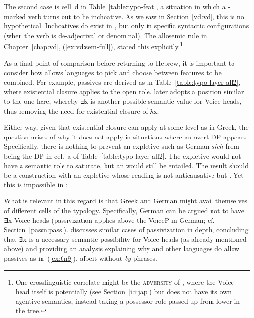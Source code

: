 \begin{exe}
\begin{xlist}
\begin{exe}
\begin{exe}
\begin{xlist}
\begin{exe}
\begin{exe}
\begin{exe}
\begin{exe}
\begin{exe}
\begin{xlist}
The second case is cell~d in Table~\ref{table:typo-feat}, a situation in which a -marked verb turns out to be inchoative. As we saw in Section~\ref{vd:vd}, this is no hypothetical. Inchoatives do exist in {\thif}, but only in specific syntactic configurations (when the verb is de-adjectival or denominal). The allosemic rule in Chapter~\ref{chap:vd}, (\ref{ex:vd:sem-full}), stated this explicitly.\footnote{One crosslinguistic correlate might be the \textsc{adversity } of  \citep{pylkkanen08,woodmarantz17}, where the Voice head itself is potentially {\vd} (see Section~\ref{i:i:jap}) but does not have its own agentive semantics, instead taking a possessor role passed up from lower in the tree.}

As a final point of comparison before returning to Hebrew, it is important to consider how  allows languages to pick and choose between features to be combined. For example,  passives are derived as in Table~\ref{table:typo-layer-all2}, where existential closure applies to the open  role. \cite{schaefer17oup} later adopts a position similar to the one here, whereby ∃x is another possible semantic value for Voice heads, thus removing the need for existential closure of λx. 

Either way, given that existential closure can apply at some level as in Greek, the question arises of why it does not apply in situations where an overt DP appears. Specifically, there is nothing to prevent an expletive such as German \emph{sich} from being the DP in cell~a of Table~\ref{table:typo-layer-all2}. The expletive would not have a semantic role to saturate, but an  would still be entailed. The result should be a construction with an expletive whose reading is not anticausative but . Yet this is impossible in :\largerpage[-2]

 \begin{exe}
	
 \z 

What is relevant in this regard is that Greek and German might avail themselves of different cells of the typology. Specifically, German can be argued not to have ∃x Voice heads (passivization applies above the VoiceP in German; cf. Section~\ref{passn:pass}). \cite{schaefer17oup} discusses similar cases of passivization in depth, concluding that ∃x is a necessary semantic possibility for Voice heads (as already mentioned above) and providing an analysis explaining why  and other languages do allow passives as in~(\ref{ex:6n9}), albeit without \emph{by}-phrases. 


\end{exe}
\end{xlist}
\end{exe}
\end{exe}
\end{exe}
\end{exe}
\end{exe}
\end{xlist}
\end{exe}
\end{exe}
\end{xlist}
\end{exe}
